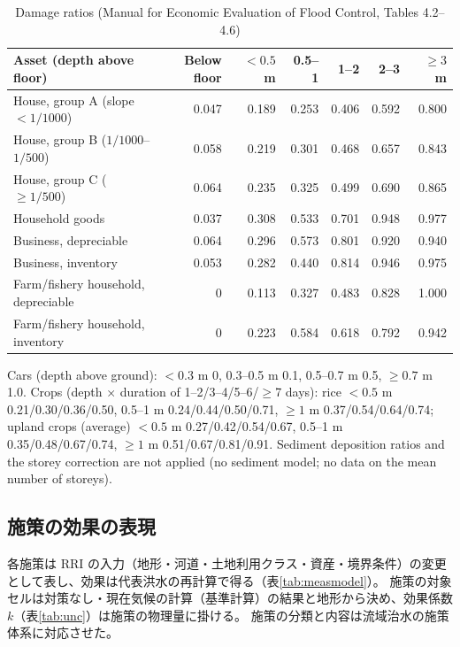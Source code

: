 \documentclass[a4paper,10pt]{ltjsarticle}
\begin{document}
\begin{table}[tbp]
\centering\footnotesize\setlength{\tabcolsep}{4pt}
\caption{Damage ratios (Manual for Economic Evaluation of Flood Control\cite{mlit_manual}, Tables 4.2--4.6)}
\label{tab:damrate}
\begin{tabular}{@{}lrrrrrr@{}}
\toprule
Asset (depth above floor) & Below floor & $<0.5$ m & 0.5--1 & 1--2 & 2--3 & $\ge3$ m \\
\midrule
House, group A (slope $<1/1000$) & 0.047 & 0.189 & 0.253 & 0.406 & 0.592 & 0.800 \\
House, group B ($1/1000$--$1/500$) & 0.058 & 0.219 & 0.301 & 0.468 & 0.657 & 0.843 \\
House, group C ($\ge1/500$) & 0.064 & 0.235 & 0.325 & 0.499 & 0.690 & 0.865 \\
Household goods & 0.037 & 0.308 & 0.533 & 0.701 & 0.948 & 0.977 \\
Business, depreciable & 0.064 & 0.296 & 0.573 & 0.801 & 0.920 & 0.940 \\
Business, inventory & 0.053 & 0.282 & 0.440 & 0.814 & 0.946 & 0.975 \\
Farm/fishery household, depreciable & 0 & 0.113 & 0.327 & 0.483 & 0.828 & 1.000 \\
Farm/fishery household, inventory & 0 & 0.223 & 0.584 & 0.618 & 0.792 & 0.942 \\
\bottomrule
\end{tabular}
\par\footnotesize\raggedright Cars (depth above ground): $<0.3$ m 0, 0.3--0.5 m 0.1, 0.5--0.7 m 0.5, $\ge0.7$ m 1.0.
Crops (depth × duration of 1--2/3--4/5--6/$\ge$7 days): rice $<0.5$ m 0.21/0.30/0.36/0.50, 0.5--1 m 0.24/0.44/0.50/0.71, $\ge1$ m 0.37/0.54/0.64/0.74;
upland crops (average) $<0.5$ m 0.27/0.42/0.54/0.67, 0.5--1 m 0.35/0.48/0.67/0.74, $\ge1$ m 0.51/0.67/0.81/0.91.
Sediment deposition ratios and the storey correction are not applied (no sediment model; no data on the mean number of storeys).
\end{table}

\subsection{施策の効果の表現}
\label{sec:meas-model}
各施策は RRI の入力（地形・河道・土地利用クラス・資産・境界条件）の変更として表し、効果は代表洪水の再計算で得る（表\ref{tab:measmodel}）。
施策の対象セルは対策なし・現在気候の計算（基準計算）の結果と地形から決め、効果係数 $k$（表\ref{tab:unc}）は施策の物理量に掛ける。
施策の分類と内容は流域治水の施策体系\cite{mlit_ryuiki}に対応させた。
\end{document}

